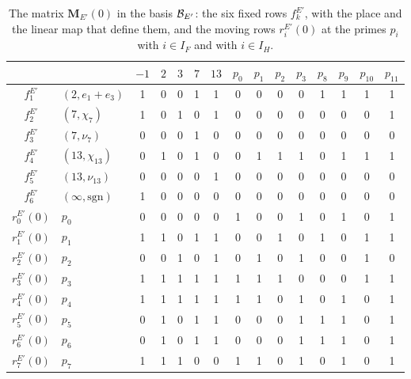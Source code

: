 \begin{table}[htbp]
\centering
\caption{The matrix $\mathbf M_{E'}(0)$ in the basis $\mathcal B_{E'}$: the six
fixed rows $f^{E'}_k$, with the place and the linear map that define them, and the
moving rows $r^{E'}_i(0)$ at the primes $p_i$ with $i\in I_F$ and with
$i\in I_H$.}
\label{tab:r7-MEp}
\small
\setlength{\tabcolsep}{4pt}
\begin{tabular}{cl@{\hspace{10pt}}ccccc@{\hspace{14pt}}cccccccc}
\toprule
 & & $-1$ & $2$ & $3$ & $7$ & $13$ & $p_0$ & $p_1$ & $p_2$ & $p_3$ & $p_8$ & $p_9$ & $p_{10}$ & $p_{11}$\\
\midrule
$f^{E'}_1$ & $(2,e_1+e_3)$ & 1 & 0 & 0 & 1 & 1 & 0 & 0 & 0 & 0 & 1 & 1 & 1 & 1 \\
$f^{E'}_2$ & $(7,\chi_7)$ & 1 & 0 & 1 & 0 & 1 & 0 & 0 & 0 & 0 & 0 & 0 & 0 & 1 \\
$f^{E'}_3$ & $(7,\nu_7)$ & 0 & 0 & 0 & 1 & 0 & 0 & 0 & 0 & 0 & 0 & 0 & 0 & 0 \\
$f^{E'}_4$ & $(13,\chi_{13})$ & 0 & 1 & 0 & 1 & 0 & 0 & 1 & 1 & 1 & 0 & 1 & 1 & 1 \\
$f^{E'}_5$ & $(13,\nu_{13})$ & 0 & 0 & 0 & 0 & 1 & 0 & 0 & 0 & 0 & 0 & 0 & 0 & 0 \\
$f^{E'}_6$ & $(\infty,\mathrm{sgn})$ & 1 & 0 & 0 & 0 & 0 & 0 & 0 & 0 & 0 & 0 & 0 & 0 & 0 \\
\addlinespace
$r^{E'}_0(0)$ & $p_0$ & 0 & 0 & 0 & 0 & 0 & 1 & 0 & 0 & 1 & 0 & 1 & 0 & 1 \\
$r^{E'}_1(0)$ & $p_1$ & 1 & 1 & 0 & 1 & 1 & 0 & 0 & 1 & 0 & 1 & 0 & 1 & 1 \\
$r^{E'}_2(0)$ & $p_2$ & 0 & 0 & 1 & 0 & 1 & 0 & 1 & 0 & 1 & 0 & 0 & 1 & 0 \\
$r^{E'}_3(0)$ & $p_3$ & 1 & 1 & 1 & 1 & 1 & 1 & 1 & 1 & 0 & 0 & 0 & 1 & 1 \\
\addlinespace
$r^{E'}_4(0)$ & $p_4$ & 1 & 1 & 1 & 1 & 1 & 1 & 1 & 0 & 1 & 0 & 1 & 0 & 1 \\
$r^{E'}_5(0)$ & $p_5$ & 0 & 1 & 0 & 1 & 1 & 0 & 0 & 0 & 1 & 1 & 1 & 0 & 1 \\
$r^{E'}_6(0)$ & $p_6$ & 0 & 1 & 0 & 1 & 1 & 0 & 0 & 0 & 1 & 1 & 1 & 0 & 1 \\
$r^{E'}_7(0)$ & $p_7$ & 1 & 1 & 1 & 0 & 0 & 1 & 1 & 0 & 1 & 0 & 1 & 0 & 1 \\
\bottomrule
\end{tabular}
\end{table}

